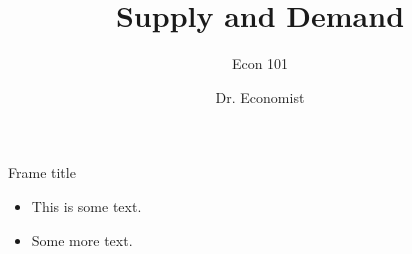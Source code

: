 \documentclass{beamer}
\title{Supply and Demand}
\subtitle{Econ 101}
\author{Dr. Economist}
\institute{College of Dreams}
\date{}
\begin{document}
\begin{frame}{Frame title}
\begin{itemize}
    \item This is some text.
    \item Some more text. 
\end{itemize}
\end{frame}
\end{document}
